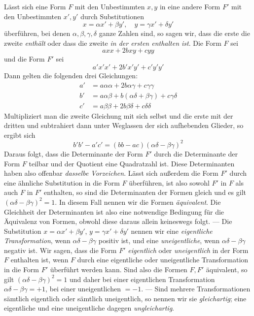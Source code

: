 Lässt sich eine Form $F$ mit den Unbestimmten $x,y$ in eine andere Form $F'$ mit den Unbestimmten $x',y'$ durch Substitutionen
\[
x=\alpha x'+\beta y',\quad y=\gamma x'+\delta y'
\]
überführen, bei denen $\alpha,\beta,\gamma,\delta$ ganze Zahlen sind, so sagen wir, dass die erste die zweite \textit{enthält} oder dass die zweite \textit{in der ersten enthalten ist}. Die Form $F$ sei
\[
axx+2bxy+cyy
\]
und die Form $F'$ sei
\[
a'x'x'+2b'x'y'+c'y'y'
\]
Dann gelten die folgenden drei Gleichungen:
\[
\begin{aligned}
a'&=a\alpha\alpha+2b\alpha\gamma+c\gamma\gamma\\
b'&=a\alpha\beta+b(\alpha\delta+\beta\gamma)+c\gamma\delta\\
c'&=a\beta\beta+2b\beta\delta+c\delta\delta
\end{aligned}
\]
Multipliziert man die zweite Gleichung mit sich selbst und die erste mit der dritten und subtrahiert dann unter Weglassen der sich aufhebenden Glieder, so ergibt sich
\[
b'b'-a'c'=(bb-ac)(\alpha\delta-\beta\gamma)^2
\]
Daraus folgt, dass die Determinante der Form $F'$ durch die Determinante der Form $F$ teilbar und der Quotient eine Quadratzahl ist. Diese Determinanten haben also offenbar \textit{dasselbe Vorzeichen}. Lässt sich außerdem die Form $F'$ durch eine ähnliche Substitution in die Form $F$ überführen, ist also sowohl $F'$ in $F$ als auch $F$ in $F'$ enthalten, so sind
die Determinanten der Formen gleich und es gilt $(\alpha\delta-\beta\gamma)^2=1$. In diesem Fall nennen wir die Formen \textit{äquivalent}. Die Gleichheit der Determinanten ist also eine notwendige Bedingung für die Äquivalenz von Formen, obwohl diese daraus allein keineswegs folgt. --- Die Substitution $x=\alpha x'+\beta y'$, $y=\gamma x'+\delta y'$ nennen wir eine \textit{eigentliche Transformation}, wenn $\alpha\delta-\beta\gamma$ positiv ist, und eine \textit{uneigentliche}, wenn $\alpha\delta-\beta\gamma$ negativ ist. Wir sagen, dass die Form $F'$ \textit{eigentlich} oder \textit{uneigentlich} in der Form $F$ enthalten ist, wenn $F$ durch eine eigentliche oder uneigentliche Transformation in die Form $F'$ überführt werden kann. Sind also die Formen $F,F'$ äquivalent, so gilt $(\alpha\delta-\beta\gamma)^2=1$ und daher bei einer eigentlichen Transformation $\alpha\delta-\beta\gamma=+1$, bei einer uneigentlichen $=-1$. --- Sind mehrere Transformationen sämtlich eigentlich oder sämtlich uneigentlich, so nennen wir sie \textit{gleichartig}; eine eigentliche und eine uneigentliche dagegen \textit{ungleichartig}.

